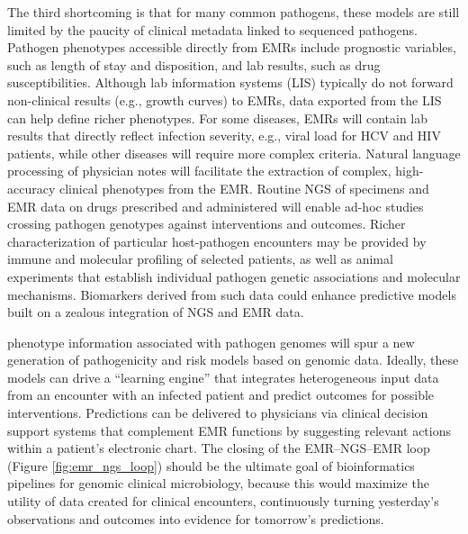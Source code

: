 The third shortcoming is that for many common pathogens, these models are still limited by the paucity of clinical metadata linked to sequenced pathogens. Pathogen phenotypes accessible directly from EMRs include prognostic variables, such as length of stay and disposition, and lab results, such as drug susceptibilities. Although lab information systems (LIS) typically do not forward non-clinical results (e.g., growth curves) to EMRs, data exported from the LIS can help define richer phenotypes. For some diseases, EMRs will contain lab results that directly reflect infection severity, e.g., viral load for HCV and HIV patients,\autocite{Norton2014} while other diseases will require more complex criteria.\autocite{DeLisle2013,Klompas2008,Silva2013} Natural language processing of physician notes will facilitate the extraction of complex, high-accuracy clinical phenotypes from the EMR.\autocite{Liao2015,Silva2013} Routine NGS of specimens and EMR data on drugs prescribed and administered will enable ad-hoc studies crossing pathogen genotypes against interventions and outcomes. Richer characterization of particular host-pathogen encounters may be provided by immune and molecular profiling of selected patients, as well as animal experiments that establish individual pathogen genetic associations and molecular mechanisms. Biomarkers derived from such data\autocite{Mejias2014,Querec2009} could enhance predictive models built on a zealous integration of NGS and EMR data.

 phenotype information associated with pathogen genomes will spur a new generation of pathogenicity and risk models based on genomic data. Ideally, these models can drive a “learning engine” that integrates heterogeneous input data from an encounter with an infected patient and predict outcomes for possible interventions. Predictions can be delivered to physicians via clinical decision support systems that complement EMR functions by suggesting relevant actions within a patient’s electronic chart. The closing of the EMR–NGS–EMR loop (Figure \ref{fig:emr_ngs_loop}) should be the ultimate goal of bioinformatics pipelines for genomic clinical microbiology, because this would maximize the utility of data created for clinical encounters, continuously turning yesterday’s observations and outcomes into evidence for tomorrow’s predictions.

